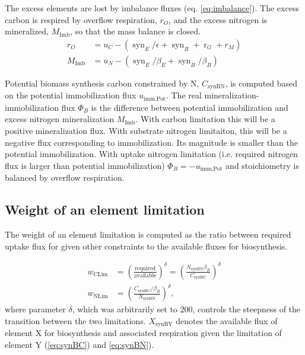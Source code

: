 The excess elements are lost by imbalance fluxes (eq. \ref{eq:imbalance}).
The excess carbon is respired by overflow respiration, $r_O$, and the excess
nitrogen is mineralized, $M_{\operatorname{Imb}}$, so that the mass
balance is closed.
\begin{subequations}
\label{eq:imbalance}
\begin{align}
r_O &= u_C - (\operatorname{syn}_E /\epsilon  + \operatorname{syn}_B
+ \operatorname{r}_G + r_M )\\
M_{\operatorname{Imb}} &= u_N - (\operatorname{syn}_E/\beta_E +
\operatorname{syn}_{B}/\beta_B)
\end{align}
\end{subequations}

Potential biomass synthesis carbon constrained by N, $C_{\operatorname{synBN}}$,
is computed based on the potential immobilization flux
$u_{\operatorname{imm,Pot}}$. The real mineralization-immobilization flux $\Phi_B$ is the difference
between potential immobilization and excess nitrogen mineralization
$M_{\operatorname{Imb}}$. With carbon limitation this will be a positive
mineralization flux. With substrate nitrogen limitaiton, this will be a
negative flux corresponding to immobilization. Its magnitude is smaller than
the potential immobilization.
With uptake nitrogen limitation (i.e. required nitrogen flux is larger than
potential immobilization) $\Phi_B = -u_{\operatorname{imm,Pot}}$ and stoichiometry
is balanced by overflow respiration.

\subsection{Weight of an element limitation}

The weight of an element limitation is computed as the ratio between required
uptake flux for given other constraints to the available fluxes for
biosynthesis.
  
\begin{subequations}
\label{eq:weightsLim}
\begin{align}
w_{\operatorname{CLim}} &= \left( \frac{\text{required}}{\text{available}}
\right)^\delta 
= \left( \frac{ N_{\operatorname{synBN}} \beta_B }{ C_{\operatorname{synBC}} }
\right)^\delta
\\
w_{\operatorname{NLim}} &= \left( \frac{ C_{\operatorname{synBC}} / \beta_B }{
N_{\operatorname{synBN}} } \right)^\delta
\text{,} 
\end{align}
\end{subequations}
where parameter $\delta$, which was arbitrarily set to 200, controls
the steepness of the transition between the two limitations.
$X_{\operatorname{synBY}}$ denotes the available flux of element X for
biosynthesis and associated respiration given the limitation of element Y
(\ref{eq:synBC}) and \ref{eq:synBN}).


